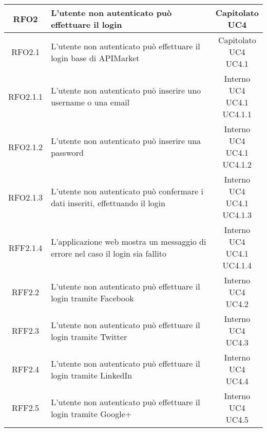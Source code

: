 \begin{longtable}{|c|p{8cm}|c|}
RFO2 & L'utente non autenticato può effettuare il login & \makecell*{Capitolato\\UC4} \\
\hline

RFO2.1 & L'utente non autenticato può effettuare il login base di APIMarket & \makecell*{Capitolato\\UC4\\UC4.1} \\
\hline

RFO2.1.1 & L'utente non autenticato può inserire uno username o una email & \makecell*{Interno\\UC4\\UC4.1\\UC4.1.1} \\
\hline
RFO2.1.2 & L'utente non autenticato può inserire una password & \makecell*{Interno\\UC4\\UC4.1\\UC4.1.2} \\
\hline
RFO2.1.3 & L'utente non autenticato può confermare i dati inseriti, effettuando il login & \makecell*{Interno\\UC4\\UC4.1\\UC4.1.3} \\
\hline
RFF2.1.4 & L'applicazione web mostra un messaggio di errore nel caso il login sia fallito & \makecell*{Interno\\UC4\\UC4.1\\UC4.1.4} \\
\hline

RFF2.2 & L'utente non autenticato può effettuare il login tramite Facebook & \makecell*{Interno\\UC4\\UC4.2} \\
\hline
RFF2.3 & L'utente non autenticato può effettuare il login tramite Twitter & \makecell*{Interno\\UC4\\UC4.3} \\
\hline
RFF2.4 & L'utente non autenticato può effettuare il login tramite LinkedIn & \makecell*{Interno\\UC4\\UC4.4} \\
\hline
RFF2.5 & L'utente non autenticato può effettuare il login tramite Google+ & \makecell*{Interno\\UC4\\UC4.5} \\
\hline


\end{longtable}
